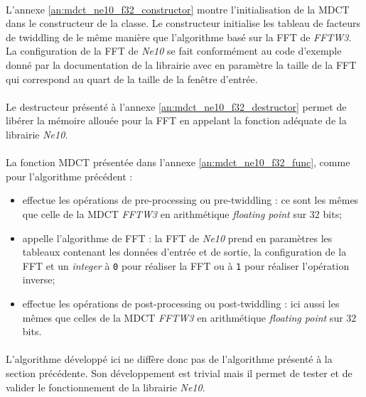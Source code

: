\documentclass{article}
\begin{document}
    \paragraph{}
    L'annexe \ref{an:mdct_ne10_f32_constructor} montre l'initialisation de la MDCT dans le constructeur de la classe. Le constructeur initialise les tableau de facteurs de twiddling de le même manière que l'algorithme basé sur la FFT de \emph{FFTW3}. La configuration de la FFT de \emph{Ne10} se fait conformément au code d'exemple donné par la documentation de la librairie\cite{Ne10} avec en paramètre la taille de la FFT qui correspond au quart de la taille de la fenêtre d'entrée.

    \paragraph{}
    Le destructeur présenté à l'annexe \ref{an:mdct_ne10_f32_destructor} permet de libérer la mémoire allouée pour la FFT en appelant la fonction adéquate de la librairie \emph{Ne10}.

    \paragraph{}
    La fonction MDCT présentée dans l'annexe \ref{an:mdct_ne10_f32_func}, comme pour l'algorithme précédent :
    \begin{itemize}
        \item effectue les opérations de pre-processing ou pre-twiddling : ce sont les mêmes que celle de la MDCT \emph{FFTW3} en arithmétique \emph{floating point} sur 32 bits;
        \item appelle l'algorithme de FFT : la FFT de \emph{Ne10} prend en paramètres les tableaux contenant les données d'entrée et de sortie, la configuration de la FFT et un \emph{integer} à \texttt{0} pour réaliser la FFT ou à \texttt{1} pour réaliser l'opération inverse;
        \item effectue les opérations de post-processing ou post-twiddling : ici aussi les mêmes que celles de la MDCT \emph{FFTW3} en arithmétique \emph{floating point} sur 32 bits.
    \end{itemize}

    \paragraph{}
    L'algorithme développé ici ne diffère donc pas de l'algorithme présenté à la section précédente. Son développement est trivial mais il permet de tester et de valider le fonctionnement de la librairie \emph{Ne10}.
\end{document}
